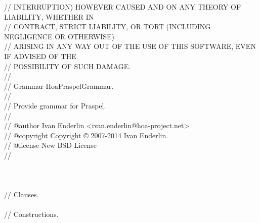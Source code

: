 \begin{bigbigpre}
// INTERRUPTION) HOWEVER CAUSED AND ON ANY THEORY OF LIABILITY, WHETHER IN \\
// CONTRACT, STRICT LIABILITY, OR TORT (INCLUDING NEGLIGENCE OR OTHERWISE) \\
// ARISING IN ANY WAY OUT OF THE USE OF THIS SOFTWARE, EVEN IF ADVISED OF THE \\
// POSSIBILITY OF SUCH DAMAGE. \\
// \\
// Grammar \bslash{}Hoa\bslash{}Praspel\bslash{}Grammar. \\
// \\
// Provide grammar for Praspel. \\
// \\
// @author     Ivan Enderlin <ivan.enderlin@hoa-project.net> \\
// @copyright  Copyright © 2007-2014 Ivan Enderlin. \\
// @license    New BSD License \\
// \\
 \\
 \\
 \\
// Clauses. \\
 \\
// Constructions. \\

\end{bigbigpre}
